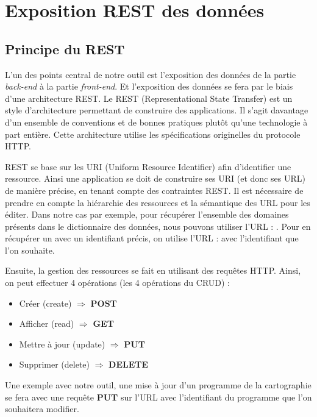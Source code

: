 \documentclass{polytech/polytech}
\begin{document}
\chapter{Exposition REST des données}

\section{Principe du REST}

L'un des points central de notre outil est l'exposition des données de la partie \textit{back-end} à la partie \textit{front-end}. Et l'exposition des données se fera par le biais d'une architecture REST. Le REST (Representational State Transfer) est un style d'architecture permettant de construire des applications. Il s'agit davantage d'un ensemble de conventions et de bonnes pratiques plutôt qu'une technologie à part entière. Cette architecture utilise les spécifications originelles du protocole HTTP. 

REST se base sur les URI (Uniform Resource Identifier) afin d’identifier une ressource. Ainsi une application se doit de construire ses URI (et donc ses URL) de manière précise, en tenant compte des contraintes REST. Il est nécessaire de prendre en compte la hiérarchie des ressources et la sémantique des URL pour les éditer. Dans notre cas par exemple, pour récupérer l'ensemble des domaines présents dans le dictionnaire des données, nous pouvons utiliser l'URL : . Pour en récupérer un avec un identifiant précis, on utilise l'URL :  avec l'identifiant que l'on souhaite.

Ensuite, la gestion des ressources se fait en utilisant des requêtes HTTP. Ainsi, on peut effectuer 4 opérations (les 4 opérations du CRUD) :

\begin{itemize}
	\item Créer (create) $\Rightarrow$ \textbf{POST}
	\item Afficher (read) $\Rightarrow$ \textbf{GET}
	\item Mettre à jour (update) $\Rightarrow$ \textbf{PUT}
	\item Supprimer (delete) $\Rightarrow$ \textbf{DELETE}
\end{itemize}

Une exemple avec notre outil, une mise à jour d'un programme de la cartographie se fera avec une requête \textbf{PUT} sur l'URL  avec l'identifiant du programme que l'on souhaitera modifier.
\end{document}
